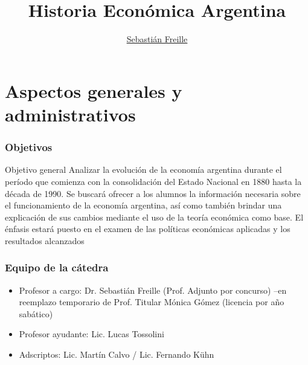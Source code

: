 \documentclass[14pt,aspectratio=169]{beamer}
\title{Historia Económica Argentina}
\author{\underline{Sebastián Freille} \inst{1}}
\institute[shortinst]{\inst{1} IEF-UNC \\ UCC}
\date{}
\begin{document}
\maketitle

{
  \begin{frame}
    \titlepage
  \end{frame}
}

\section{Aspectos generales y administrativos}

 \begin{frame}\frametitle{Objetivos}
   \begin{block}{Objetivo general}
     Analizar la evolución de la economía argentina durante el período
    que comienza con la consolidación del Estado Nacional en 1880
    hasta la década de 1990. Se buscará ofrecer a los alumnos la
    información necesaria sobre el funcionamiento de la economía
    argentina, así como también brindar una explicación de sus cambios
    mediante el uso de la teoría económica como base. El énfasis
    estará puesto en el examen de las políticas económicas aplicadas y
    los resultados alcanzados
    \end{block}
  \end{frame}


 \begin{frame}\frametitle{Equipo de la cátedra}
   \begin{itemize}
   \item Profesor a cargo: Dr. Sebastián Freille (Prof. Adjunto por
     concurso) --en reemplazo temporario de Prof. Titular Mónica Gómez
     (licencia por año sabático)
   \item Profesor ayudante: Lic. Lucas Tossolini
   \item Adscriptos: Lic. Martín Calvo / Lic. Fernando Kühn
          \end{itemize}
  \end{frame}
  
\end{document}
